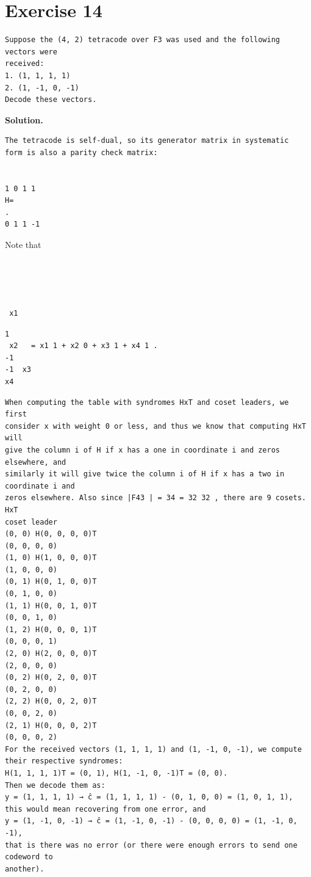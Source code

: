 \documentclass[11pt]{article}
\begin{document}
\section*{Exercise 14}
\begin{exercisebox}
\begin{Verbatim}[fontsize=\small]
Suppose the (4, 2) tetracode over F3 was used and the following vectors were
received:
1. (1, 1, 1, 1)
2. (1, -1, 0, -1)
Decode these vectors.
\end{Verbatim}
\end{exercisebox}
\begin{solutionbox}
\textbf{Solution.}

\begin{Verbatim}[fontsize=\small]
The tetracode is self-dual, so its generator matrix in systematic
form is also a parity check matrix:


1 0 1 1
H=
.
0 1 1 -1
\end{Verbatim}
Note that 

\begin{Verbatim}[fontsize=\small]
 
 
 
 
 x1
\end{Verbatim}
\begin{Verbatim}[fontsize=\small]
1
 x2   = x1 1 + x2 0 + x3 1 + x4 1 .
-1
-1  x3
x4
\end{Verbatim}
\begin{Verbatim}[fontsize=\small]
When computing the table with syndromes HxT and coset leaders, we first
consider x with weight 0 or less, and thus we know that computing HxT will
give the column i of H if x has a one in coordinate i and zeros elsewhere, and
similarly it will give twice the column i of H if x has a two in coordinate i and
zeros elsewhere. Also since |F43 | = 34 = 32 32 , there are 9 cosets.
HxT
coset leader
(0, 0) H(0, 0, 0, 0)T
(0, 0, 0, 0)
(1, 0) H(1, 0, 0, 0)T
(1, 0, 0, 0)
(0, 1) H(0, 1, 0, 0)T
(0, 1, 0, 0)
(1, 1) H(0, 0, 1, 0)T
(0, 0, 1, 0)
(1, 2) H(0, 0, 0, 1)T
(0, 0, 0, 1)
(2, 0) H(2, 0, 0, 0)T
(2, 0, 0, 0)
(0, 2) H(0, 2, 0, 0)T
(0, 2, 0, 0)
(2, 2) H(0, 0, 2, 0)T
(0, 0, 2, 0)
(2, 1) H(0, 0, 0, 2)T
(0, 0, 0, 2)
For the received vectors (1, 1, 1, 1) and (1, -1, 0, -1), we compute their respective syndromes:
H(1, 1, 1, 1)T = (0, 1), H(1, -1, 0, -1)T = (0, 0).
Then we decode them as:
y = (1, 1, 1, 1) → ĉ = (1, 1, 1, 1) - (0, 1, 0, 0) = (1, 0, 1, 1),
this would mean recovering from one error, and
y = (1, -1, 0, -1) → ĉ = (1, -1, 0, -1) - (0, 0, 0, 0) = (1, -1, 0, -1),
that is there was no error (or there were enough errors to send one codeword to
another).
\end{Verbatim}
\end{solutionbox}
\end{document}
